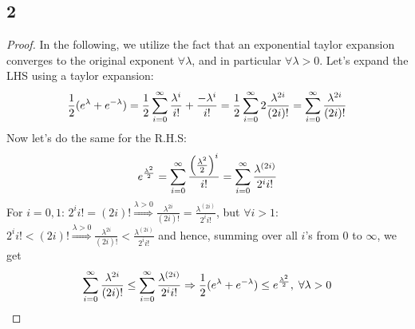 \subsection*{2}
\begin{proof}
    In the following, we utilize the fact that an exponential taylor expansion converges to the original exponent $\forall \lambda$, and in particular $\forall \lambda>0$.
    Let's expand the LHS using a taylor expansion:
    \begin{equation*}
        \frac{1}{2} (e^\lambda + e^{-\lambda}) = \frac{1}{2} \sum_{i=0}^{\infty} \frac{\lambda^i}{i!} + \frac{-\lambda^i}{i!} 
        = \frac{1}{2} \sum_{i=0}^{\infty} 2\frac{\lambda^{2i}}{(2i)!} = \sum_{i=0}^{\infty} \frac{\lambda^{2i}}{(2i)!}
    \end{equation*}
    Now let's do the same for the R.H.S:
    \begin{equation*}
        e^{\frac{\lambda^2}{2}} = \sum_{i=0}^{\infty} \frac{\left(\frac{\lambda^2}{2}\right)^i}{i!} = 
        \sum_{i=0}^{\infty} \frac{\lambda^{(2i)}}{2^i i!}
    \end{equation*}
    For $i=0, 1$: $2^i i! = (2i)! \overset{\lambda > 0}{\Rightarrow}\frac{\lambda^{2i}}{(2i)!} = \frac{\lambda^{(2i)}}{2^i i!}$, but $\forall i>1$: $2^i i! < (2i)! \overset{\lambda > 0}{\Rightarrow} \frac{\lambda^{2i}}{(2i)!} < \frac{\lambda^{(2i)}}{2^i i!}$ 
    and hence, summing over all $i$'s from 0 to $\infty$, we get 
    \begin{equation*}
        \sum_{i=0}^{\infty} \frac{\lambda^{2i}}{(2i)!} \leq \sum_{i=0}^{\infty} \frac{\lambda^{(2i)}}{2^i i!} \Rightarrow
        \frac{1}{2} (e^\lambda + e^{-\lambda}) \leq e^{\frac{\lambda^2}{2}}, \; \forall \lambda > 0
    \end{equation*}
\end{proof}

